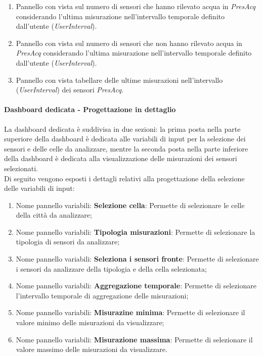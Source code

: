 \begin{enumerate}
\begin{enumerate}
\item Pannello con vista sul numero di sensori che hanno rilevato acqua in \textit{PresAcq} considerando l'ultima misurazione nell'intervallo temporale definito dall'utente (\textit{UserInterval}).
\item Pannello con vista sul numero di sensori che non hanno rilevato acqua in \textit{PresAcq} considerando l'ultima misurazione nell'intervallo temporale definito dall'utente (\textit{UserInterval}).
\item Pannello con vista tabellare delle ultime misurazioni nell'intervallo (\textit{UserInterval}) dei sensori \textit{PresAcq}.
\end{enumerate}
\end{enumerate}


\paragraph*{Dashboard dedicata - Progettazione in dettaglio}
La dashboard dedicata è suddivisa in due sezioni: la prima posta nella parte superiore della dashboard è dedicata alle variabili di input per la selezione dei sensori e delle celle da analizzare, mentre la seconda posta nella parte inferiore della dashboard è dedicata alla visualizzazione delle misurazioni dei sensori selezionati.\\
Di seguito vengono esposti i dettagli relativi alla progettazione della selezione delle variabili di input:
\begin{enumerate}
    \item Nome pannello variabili: \textbf{Selezione cella}: Permette di selezionare le celle della città da analizzare;
    \item Nome pannello variabili: \textbf{Tipologia misurazioni}: Permette di selezionare la tipologia di sensori da analizzare;
    \item Nome pannello variabili: \textbf{Seleziona i sensori fronte}: Permette di selezionare i sensori da analizzare della tipologia e della cella selezionata;
    \item Nome pannello variabili: \textbf{Aggregazione temporale}: Permette di selezionare l'intervallo temporale di aggregazione delle misurazioni;
    \item Nome pannello variabili: \textbf{Misurazine minima}: Permette di selezionare il valore minimo delle misurazioni da visualizzare;
    \item Nome pannello variabili: \textbf{Misurazione massima}: Permette di selezionare il valore massimo delle misurazioni da visualizzare.
\end{enumerate}
